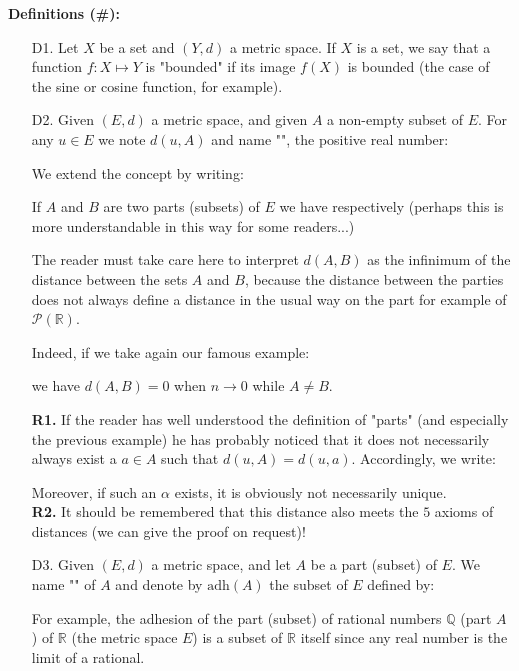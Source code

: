 	\textbf{Definitions (\#\mydef):}
	\begin{enumerate}
		\item[D1.] Let $X$ be a set and $(Y,d)$ a metric space. If $X$ is a set, we say that a function $f: X\mapsto Y$ is "bounded" if its image $f (X)$ is bounded (the case of the sine or cosine function, for example).
		
		\item[D2.] Given $(E, d)$ a metric space, and given $A$ a non-empty subset of $E$. For any $u\in E$ we note $d(u, A)$ and name "", the positive real number:
		
		We extend the concept by writing:
		
		If $A$ and $B$ are two parts (subsets) of $E$ we have respectively (perhaps this is more understandable in this way for some readers...)
		
		The reader must take care here to interpret $d(A,B)$ as the infinimum of the distance between the sets $A$ and $B$, because the distance between the parties does not always define a distance in the usual way on the part for example of $\mathcal{P}(\mathbb{R})$.
		
		Indeed, if we take again our famous example:
			
	 	we have $d(A,B)=0$ when $n \rightarrow 0$ while $A\neq B$.
	 	\begin{tcolorbox}[title=Remarks,colframe=black,arc=10pt]
		\textbf{R1.} If the reader has well understood the definition of "parts" (and especially the previous example) he has probably noticed that it does not necessarily always exist a $a\in A$ such that $d(u,A)=d(u,a)$. Accordingly, we write:
		
		Moreover, if such an $\alpha$ exists, it is obviously not necessarily unique.\\
		
		\textbf{R2.} It should be remembered that this distance also meets the $5$ axioms of distances (we can give the proof on request)!
		\end{tcolorbox}	
	
		\item[D3.] Given $(E, d)$ a metric space, and let $A$ be a part (subset) of $E$. We name "" of $A$ and denote by $\text{adh} (A)$ the subset of $E$ defined by:
		
		For example, the adhesion of the part (subset) of rational numbers $\mathbb{Q}$ (part $A$) of $\mathbb{R}$  (the metric space $E$) is a subset of $\mathbb{R}$ itself since any real number is the limit of a rational.
		

\end{enumerate}
